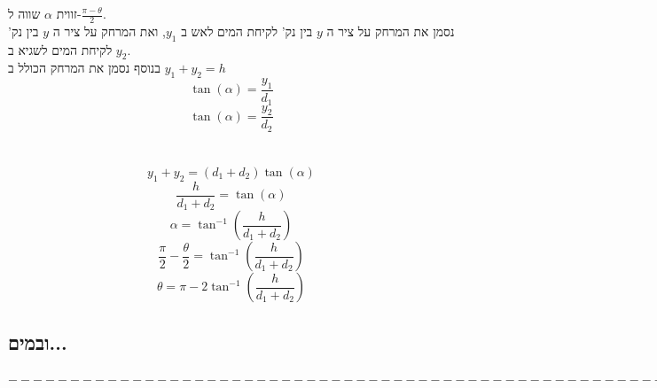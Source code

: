 \documentclass{article}
\begin{document}
זווית $\alpha$ שווה ל-$\frac{\pi - \theta}{2}$.\\
נסמן את המרחק על ציר ה
$y$ 
בין נק' לקיחת המים לאש ב
$y_1$,
ואת המרחק על ציר ה
$y$
בין נק' לקיחת המים לשגיא ב
$y_2$.\\
בנוסף נסמן את המרחק הכולל ב
$y_1+y_2 = h$
\begin{equation*}
    \tan (\alpha) = \frac{y_1}{d_1}
\end{equation*}
\begin{equation*}
    \tan (\alpha) = \frac{y_2}{d_2}
\end{equation*}
\\
\\
\begin{equation*}
    y_1 + y_2 = (d_1 + d_2)\tan (\alpha) 
\end{equation*}
\begin{equation*}
    \frac{h}{d_1 + d_2} = \tan (\alpha) 
\end{equation*}
\begin{equation*}
    \alpha = \tan ^ {-1} \left( \frac{h}{d_1 + d_2} \right)
\end{equation*}
\begin{equation*}
    \frac{\pi}{2} - \frac{\theta}{2} = \tan ^ {-1}\left( \frac{h}{d_1 + d_2} \right)
\end{equation*}
\begin{equation*}
    \theta = \pi - 2\tan ^ {-1} \left( \frac{h}{d_1 + d_2} \right)
\end{equation*}



\subsection*{ובמים...}
$------------------- -------------------------------------$
\end{document}
